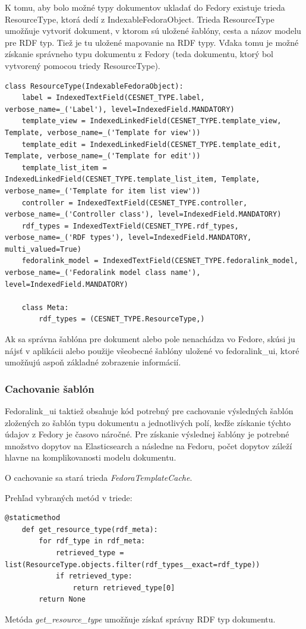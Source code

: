 \documentclass[thesis=M,slovak]{FITthesis}[2013/05/06]
\begin{document}
K tomu, aby bolo možné typy dokumentov ukladať do Fedory existuje trieda ResourceType, ktorá dedí z IndexableFedoraObject. Trieda ResourceType umožňuje vytvoriť dokument, v ktorom sú uložené šablóny, cesta a názov modelu pre RDF typ. Tiež je tu uložené mapovanie na RDF typy. Vďaka tomu je možné získanie správneho typu dokumentu z Fedory (teda dokumentu, ktorý bol vytvorený pomocou triedy ResourceType).
\begin{lstlisting}[frame=single] 
class ResourceType(IndexableFedoraObject):
    label = IndexedTextField(CESNET_TYPE.label, verbose_name=_('Label'), level=IndexedField.MANDATORY)
    template_view = IndexedLinkedField(CESNET_TYPE.template_view, Template, verbose_name=_('Template for view'))
    template_edit = IndexedLinkedField(CESNET_TYPE.template_edit, Template, verbose_name=_('Template for edit'))
    template_list_item = IndexedLinkedField(CESNET_TYPE.template_list_item, Template, verbose_name=_('Template for item list view'))
    controller = IndexedTextField(CESNET_TYPE.controller, verbose_name=_('Controller class'), level=IndexedField.MANDATORY)
    rdf_types = IndexedTextField(CESNET_TYPE.rdf_types, verbose_name=_('RDF types'), level=IndexedField.MANDATORY, multi_valued=True)
    fedoralink_model = IndexedTextField(CESNET_TYPE.fedoralink_model, verbose_name=_('Fedoralink model class name'), level=IndexedField.MANDATORY)

    class Meta:
        rdf_types = (CESNET_TYPE.ResourceType,)
\end{lstlisting}

Ak sa správna šablóna pre dokument alebo pole nenachádza vo Fedore, skúsi ju nájsť v aplikácii alebo použije všeobecné šablóny uložené vo fedoralink\_ui, ktoré umožňujú aspoň základné zobrazenie informácií.

\subsubsection{Cachovanie šablón}
Fedoralink\_ui taktiež obsahuje kód potrebný pre cachovanie výsledných šablón zložených zo šablón typu dokumentu a jednotlivých polí, keďže získanie týchto údajov z Fedory je časovo náročné. Pre získanie výslednej šablóny je potrebné množstvo dopytov na Elasticsearch a následne na Fedoru, počet dopytov záleží hlavne na komplikovanosti modelu dokumentu.

O cachovanie sa stará trieda {\em FedoraTemplateCache}.

Prehľad vybraných metód v triede:
\begin{lstlisting}[frame=single] 
@staticmethod
    def get_resource_type(rdf_meta):
        for rdf_type in rdf_meta:
            retrieved_type = list(ResourceType.objects.filter(rdf_types__exact=rdf_type))
            if retrieved_type:
                return retrieved_type[0]
        return None
\end{lstlisting}
Metóda {\em get\_resource\_type} umožňuje získať správny RDF typ dokumentu.
\end{document}
